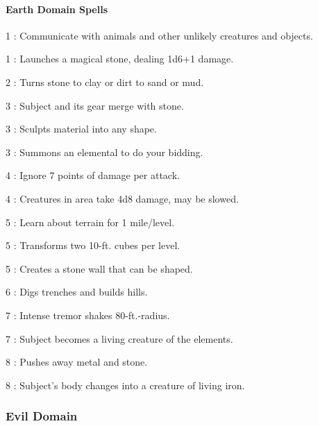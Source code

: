 \paragraph{Earth Domain Spells}
\begin{list}{}{\leftmargin=1em}
\item[1] : Communicate with animals and other unlikely creatures and objects.
\item[1] : Launches a magical stone, dealing 1d6+1 damage.
\item[2] : Turns stone to clay or dirt to sand or mud.
\item[3] : Subject and its gear merge with stone.
\item[3] : Sculpts material into any shape.
\item[3] : Summons an elemental to do your bidding.
\item[4] : Ignore 7 points of damage per attack.
\item[4] : Creatures in area take 4d8 damage, may be slowed.
\item[5] : Learn about terrain for 1 mile/level.
\item[5] : Transforms two 10-ft. cubes per level.
\item[5] : Creates a stone wall that can be shaped.
\item[6] : Digs trenches and builds hills.
\item[7] : Intense tremor shakes 80-ft.-radius.
\item[7] : Subject becomes a living creature of the elements.
\item[8] : Pushes away metal and stone.
\item[8] : Subject's body changes into a creature of living iron.
\end{list}
\subsubsection{Evil Domain}
